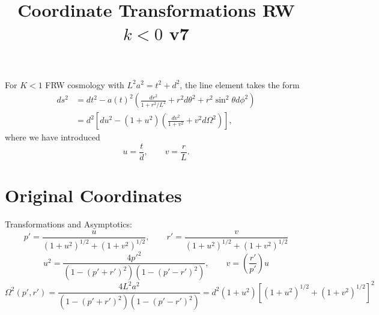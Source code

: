 \documentclass[10pt,letterpaper]{article}
\title{Coordinate Transformations RW $k<0$ v7}
\date{}
\begin{document}
 
\maketitle
\noindent 
For $K<1$ FRW cosmology with $L^2 a^2 = t^2+d^2$, the line element takes the form
\begin{align}
ds^2 &=  dt^2 - a(t)^2 \left(  \frac{dr^2}{1+r^2/L^2} + r^2 d\theta^2 + r^2\sin^2\theta d\phi^2 \right)\nonumber\\
&= d^2 \left[ du^2 - (1+u^2)\left( \frac{dv^2}{1+v^2} + v^2 d\Omega^2\right)\right] ,
\end{align}
where we have introduced
\begin{equation}
u = \frac{t}{d},\qquad v = \frac{r}{L}.
\end{equation}
\section*{Original Coordinates}
Transformations and Asymptotics:
\begin{equation}
p' = \frac{u}{(1+u^2)^{1/2}+(1+v^2)^{1/2}},\qquad r' = \frac{v}{(1+u^2)^{1/2}+(1+v^2)^{1/2}}
\end{equation}
\begin{equation}
u^2 = \frac{4 p'^2}{(1-(p'+r')^2)(1-(p'-r')^2)},\qquad v =\left(\frac{r'}{p'}\right)u
\end{equation}
\begin{equation}
\Omega^2(p',r') = \frac{4 L^2 a^2}{(1-(p'+r')^2)(1-(p'-r')^2)} = d^2(1+u^2)\left[ (1+u^2)^{1/2}+(1+v^2)^{1/2}\right]^2
\end{equation}
\end{document}
